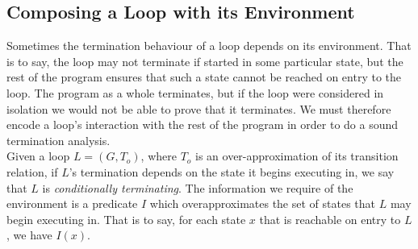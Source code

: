 \documentclass[preprint]{sigplanconf}
\theoremstyle{definition}
\newtheorem{definition}[theorem]{Definition}
\begin{document}
\begin{figure*}
\begin{framed}
 \end{framed}

\end{figure*}

\subsection{Composing a Loop with its Environment} \label{sec:env}

Sometimes the termination behaviour of a loop depends on its environment.  That is to say,
the loop may not terminate if started in some particular state, but the rest of the program
ensures that such a state cannot be reached on entry to the loop.  The program as a whole
terminates, but if the loop were considered in isolation we would not be able to prove that
it terminates.  We must therefore encode a loop's interaction with the rest of
the program in order to do a sound termination analysis.\\

\iffalse
Let us assume that we have done some preprocessing of our program which has identified
loops, straight line code blocks and the control flow between these.  In particular,
the control flow analysis has determined which order these code blocks execute in,
and the nesting structure of the loops.
\fi

Given a loop $L=(G,T_o)$, where $T_o$ is an over-approximation of its transition relation, 
if $L$'s termination depends on the state it begins
executing in, we say that $L$ is \emph{conditionally terminating}.
The information we require of the environment is a predicate $I$ which
overapproximates the set of states that $L$ may begin executing in.
That is to say, for each state $x$ that is reachable on entry to $L$,
we have $I(x)$.
\end{document}
